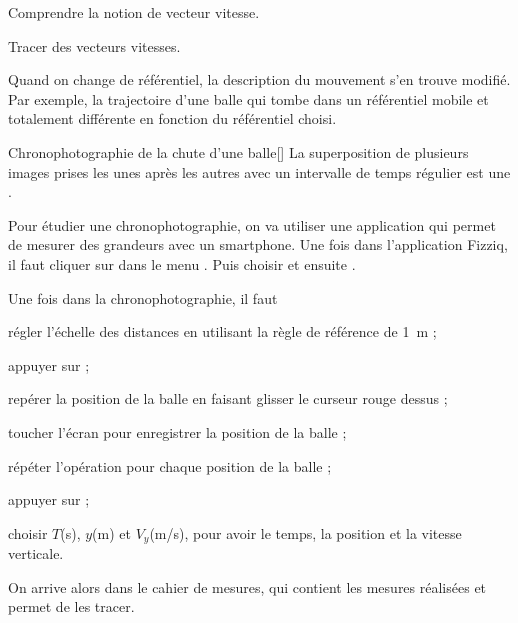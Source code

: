\teteSndMouv

\nomPrenomClasse
{}

\vspace*{-12pt}
\begin{objectifs}
  \item Comprendre la notion de vecteur vitesse.
  \item Tracer des vecteurs vitesses.
\end{objectifs}

\begin{contexte}
  Quand on change de référentiel, la description du mouvement s'en trouve modifié.
  Par exemple, la trajectoire d'une balle qui tombe dans un référentiel mobile et totalement différente en fonction du référentiel choisi.

\end{contexte}




\begin{doc}{Chronophotographie de la chute d'une balle}[\label{doc:chrono}]
  La superposition de plusieurs images prises les unes après les autres avec un intervalle de temps régulier est une .

  Pour étudier une chronophotographie, on va utiliser  une application qui permet de mesurer des grandeurs avec un smartphone.
  Une fois dans l'application Fizziq, il faut cliquer sur  dans le menu . Puis choisir  et ensuite . 

  Une fois dans la chronophotographie, il faut 
  \begin{protocole}
    \item régler l'échelle des distances en utilisant la règle de référence de \qty{1}{\m} ;
    \item appuyer sur  ;
    \item repérer la position de la balle en faisant glisser le curseur rouge dessus ;
    \item toucher l'écran pour enregistrer la position de la balle ;
    \item répéter l'opération pour chaque position de la balle ;
    \item appuyer sur  ;
    \item choisir $T$(s), $y$(m) et $V_y$(m/s), pour avoir le temps, la position et la vitesse verticale.
  \end{protocole}
  On arrive alors dans le cahier de mesures, qui contient les mesures réalisées et permet de les tracer.
\end{doc}

